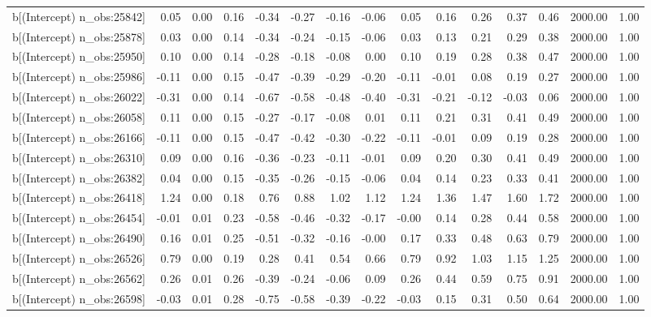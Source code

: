 \begin{table}[ht]
\begin{tabular}{rrrrrrrrrrrrrrr}
  b[(Intercept) n\_obs:25842] & 0.05 & 0.00 & 0.16 & -0.34 & -0.27 & -0.16 & -0.06 & 0.05 & 0.16 & 0.26 & 0.37 & 0.46 & 2000.00 & 1.00 \\ 
  b[(Intercept) n\_obs:25878] & 0.03 & 0.00 & 0.14 & -0.34 & -0.24 & -0.15 & -0.06 & 0.03 & 0.13 & 0.21 & 0.29 & 0.38 & 2000.00 & 1.00 \\ 
  b[(Intercept) n\_obs:25950] & 0.10 & 0.00 & 0.14 & -0.28 & -0.18 & -0.08 & 0.00 & 0.10 & 0.19 & 0.28 & 0.38 & 0.47 & 2000.00 & 1.00 \\ 
  b[(Intercept) n\_obs:25986] & -0.11 & 0.00 & 0.15 & -0.47 & -0.39 & -0.29 & -0.20 & -0.11 & -0.01 & 0.08 & 0.19 & 0.27 & 2000.00 & 1.00 \\ 
  b[(Intercept) n\_obs:26022] & -0.31 & 0.00 & 0.14 & -0.67 & -0.58 & -0.48 & -0.40 & -0.31 & -0.21 & -0.12 & -0.03 & 0.06 & 2000.00 & 1.00 \\ 
  b[(Intercept) n\_obs:26058] & 0.11 & 0.00 & 0.15 & -0.27 & -0.17 & -0.08 & 0.01 & 0.11 & 0.21 & 0.31 & 0.41 & 0.49 & 2000.00 & 1.00 \\ 
  b[(Intercept) n\_obs:26166] & -0.11 & 0.00 & 0.15 & -0.47 & -0.42 & -0.30 & -0.22 & -0.11 & -0.01 & 0.09 & 0.19 & 0.28 & 2000.00 & 1.00 \\ 
  b[(Intercept) n\_obs:26310] & 0.09 & 0.00 & 0.16 & -0.36 & -0.23 & -0.11 & -0.01 & 0.09 & 0.20 & 0.30 & 0.41 & 0.49 & 2000.00 & 1.00 \\ 
  b[(Intercept) n\_obs:26382] & 0.04 & 0.00 & 0.15 & -0.35 & -0.26 & -0.15 & -0.06 & 0.04 & 0.14 & 0.23 & 0.33 & 0.41 & 2000.00 & 1.00 \\ 
  b[(Intercept) n\_obs:26418] & 1.24 & 0.00 & 0.18 & 0.76 & 0.88 & 1.02 & 1.12 & 1.24 & 1.36 & 1.47 & 1.60 & 1.72 & 2000.00 & 1.00 \\ 
  b[(Intercept) n\_obs:26454] & -0.01 & 0.01 & 0.23 & -0.58 & -0.46 & -0.32 & -0.17 & -0.00 & 0.14 & 0.28 & 0.44 & 0.58 & 2000.00 & 1.00 \\ 
  b[(Intercept) n\_obs:26490] & 0.16 & 0.01 & 0.25 & -0.51 & -0.32 & -0.16 & -0.00 & 0.17 & 0.33 & 0.48 & 0.63 & 0.79 & 2000.00 & 1.00 \\ 
  b[(Intercept) n\_obs:26526] & 0.79 & 0.00 & 0.19 & 0.28 & 0.41 & 0.54 & 0.66 & 0.79 & 0.92 & 1.03 & 1.15 & 1.25 & 2000.00 & 1.00 \\ 
  b[(Intercept) n\_obs:26562] & 0.26 & 0.01 & 0.26 & -0.39 & -0.24 & -0.06 & 0.09 & 0.26 & 0.44 & 0.59 & 0.75 & 0.91 & 2000.00 & 1.00 \\ 
  b[(Intercept) n\_obs:26598] & -0.03 & 0.01 & 0.28 & -0.75 & -0.58 & -0.39 & -0.22 & -0.03 & 0.15 & 0.31 & 0.50 & 0.64 & 2000.00 & 1.00 \\ 

\end{tabular}
\end{table}
